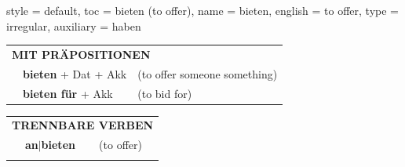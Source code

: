 \begin{verbentry}{
  style = {default},
  toc = {bieten (to offer)},
  name = {bieten},
  english = {to offer},
  type = {irregular},
  auxiliary = {haben}
}
\vspace{10pt}

\begin{tabular}{lll}
\multicolumn{3}{l}{\textbf{MIT PRÄPOSITIONEN}}\\
& \textbf{bieten} + Dat + Akk & (to offer someone something)\\
& \textbf{bieten für} + Akk & (to bid for)\\
\end{tabular}
\hfill
\begin{tabular}{lll}
\multicolumn{3}{l}{\textbf{TRENNBARE VERBEN}}\\
& \textbf{an$|$bieten} & (to offer)\\
\vspace{10pt}
\end{tabular}

\vspace{-5pt}
\end{verbentry}

